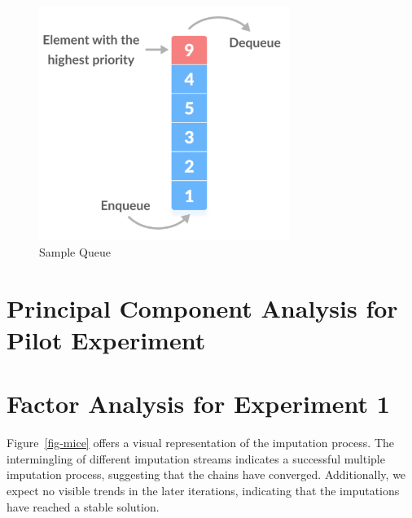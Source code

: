 \documentclass[
]{report}
\begin{document}
\begin{figure}

{\centering \includegraphics[width=3.2in,height=\textheight]{images/prioq-illustration.png}

}

\caption{Sample Queue}

\end{figure}

\newpage{}

\hypertarget{principal-component-analysis-for-pilot-experiment}{%
\section{Principal Component Analysis for Pilot
Experiment}\label{principal-component-analysis-for-pilot-experiment}}

\newpage{}

\hypertarget{factor-analysis-for-experiment-1}{%
\section{Factor Analysis for Experiment
1}\label{factor-analysis-for-experiment-1}}

Figure~\ref{fig-mice} offers a visual representation of the imputation
process. The intermingling of different imputation streams indicates a
successful multiple imputation process, suggesting that the chains have
converged. Additionally, we expect no visible trends in the later
iterations, indicating that the imputations have reached a stable
solution.
\end{document}
